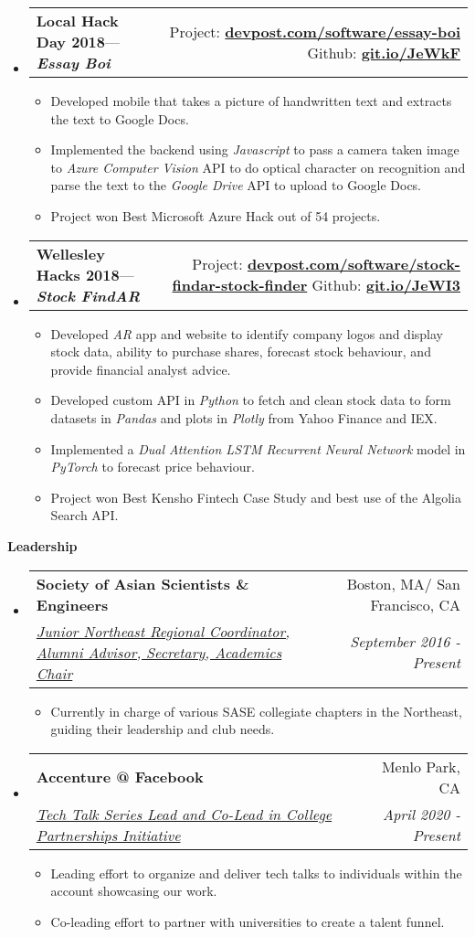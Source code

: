 \documentclass[letterpaper, 8pt]{extarticle}
\makeatletter
\newcommand{\resitem}[1]{\item #1 \vspace{-2pt}}
\newcommand{\resheading}[1]{{\large \colorbox{mygrey}{\begin{minipage}{0.99\textwidth}{\textbf{#1 \vphantom{p\^{E}}}}\end{minipage}}}}
\newcommand{\ressubheading}[4]{
\begin{tabular*}{7.40in}{l@{\extracolsep{\fill}}r}
		\textbf{#1} & #2 \\
		\textit{#3} & \textit{#4} \\
\end{tabular*}\vspace{-6pt}}
\newcommand{\smallressubheading}[4]{
\begin{tabular*}{7.40in}{l@{\extracolsep{\fill}}r}
    \textbf{#1}\space\space --- \textit{\textbf{#2}}& #3 \\
\end{tabular*}\vspace{-6pt}}
\newcommand{\genlink}[1]{\href{https://www.#1}{\textbf{#1}}} %
\makeatother
\begin{document}
\begin{itemize}
\item
    \smallressubheading{Local Hack Day 2018}{Essay Boi}{Project: \genlink{devpost.com/software/essay-boi} \space Github: \genlink{git.io/JeWkF}}\\
    \begin{itemize}
        \resitem{Developed mobile that takes a picture of handwritten text and extracts the text to Google Docs.}
        \resitem{Implemented the backend using \emph{Javascript} to pass a camera taken image to \emph{Azure Computer Vision} API to do optical character on recognition and parse the text to the \emph{Google Drive} API to upload to Google Docs.}
        \resitem{Project won Best Microsoft Azure Hack out of 54 projects.}
    \end{itemize}
    
\item
    \smallressubheading{Wellesley Hacks 2018}{Stock FindAR}{Project: \genlink{devpost.com/software/stock-findar-stock-finder} \space Github: \genlink{git.io/JeWI3}}\\
    \begin{itemize}
        \resitem{Developed \emph{AR} app and website to identify company logos and display stock data, ability to purchase shares, forecast stock behaviour, and provide financial analyst advice.}
        \resitem{Developed custom API in \emph{Python} to fetch and clean stock data to form datasets in \emph{Pandas} and plots in \emph{Plotly} from Yahoo Finance and IEX.}
        \resitem{Implemented a \emph{Dual Attention LSTM Recurrent Neural Network} model in \emph{PyTorch} to forecast price behaviour.}
        \resitem{Project won Best Kensho Fintech Case Study and best use of the Algolia Search API.}
    \end{itemize}
\end{itemize}

\resheading{Leadership}

\begin{itemize}
\setlength{\leftmargini}{0.5em}

\item
    \ressubheading{Society of Asian Scientists \& Engineers}{Boston, MA/ San Francisco, CA}{\underline{Junior Northeast Regional Coordinator, Alumni Advisor, Secretary, Academics Chair}}{September 2016 - Present}
    \begin{itemize}
        \resitem{Currently in charge of various SASE collegiate chapters in the Northeast, guiding their leadership and club needs.}
    \end{itemize}


\item
    \ressubheading{Accenture @ Facebook}{Menlo Park, CA}{\underline{Tech Talk Series Lead and Co-Lead in College Partnerships Initiative}}{April 2020 - Present}
    \begin{itemize}
        \resitem{Leading effort to organize and deliver tech talks to individuals within the account showcasing our work.}
        \resitem{Co-leading effort to partner with universities to create a talent funnel.}
    \end{itemize}
    
\end{itemize}
\end{document}
